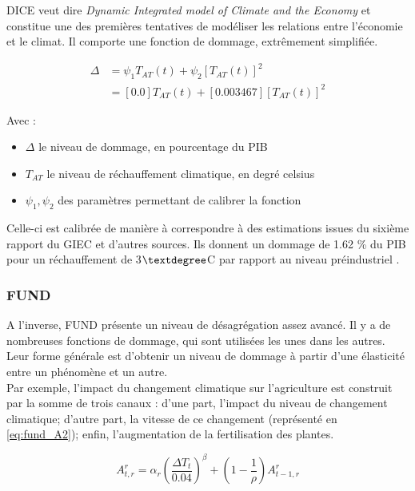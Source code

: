 DICE veut dire \emph{Dynamic Integrated model of Climate and the  Economy} et constitue une des premières tentatives de modéliser les relations entre l'économie et le climat. Il comporte une fonction de dommage, extrêmement simplifiée. 

\begin{equation}
\begin{array}{ll}
     \displaystyle  \Delta  & = \psi_{1}T_{AT}(t) + \psi_{2}[T_{AT}(t)]^{2} \\
    & = [0.0]T_{AT}(t) + [0.003467][T_{AT}(t)]^{2}
\end{array}
\label{eq:df_dice2023}
\end{equation}

Avec : 
\begin{itemize}
    \item $\Delta$ le niveau de dommage, en pourcentage du PIB
    \item $T_{AT}$ le niveau de réchauffement climatique, en degré celsius
    \item $\psi_1, \psi_2$ des paramètres permettant de calibrer la fonction
\end{itemize}

Celle-ci est calibrée de manière à correspondre à des estimations issues du sixième rapport du GIEC et d'autres sources. Ils donnent un dommage de 1.62 \% du PIB pour un réchauffement de 3$\textdegree$C par rapport au niveau préindustriel \cite{barrage_policies_2023, nordhaus_dice_2013}. 

\subsubsection{FUND} 

A l'inverse, FUND présente un niveau de désagrégation assez avancé. Il y a de nombreuses fonctions de dommage, qui sont utilisées les unes dans les autres. Leur forme générale est d'obtenir un niveau de dommage à partir d'une élasticité entre un phénomène et un autre. \\

Par exemple, l'impact du changement climatique sur l'agriculture est construit par la somme de trois canaux : d'une part, l'impact du niveau de changement climatique; d'autre part, la vitesse de ce changement (représenté en \ref{eq:fund_A2}); enfin, l'augmentation de la fertilisation des plantes. 

\begin{equation}
    A_{t,r}^{r}=\alpha_{r}\left(\frac{\Delta T_{t}}{0.04}\right)^{\beta}+\left(1-\frac{1}{\rho}\right)A_{t-1,r}^{r}
    \label{eq:fund_A2}
\end{equation}

